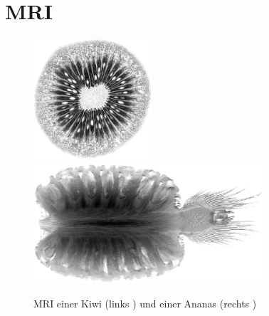 \chapter{MRI\label{chapter:mri}}
\begin{refsection}
%
%
\begin{figure}[H]
	\centering
	\includegraphics[height = 4.5cm]{./mri/pic/Kiwi.jpg}
	\qquad
	\includegraphics[height = 4.5cm]{./mri/pic/Pinaple.jpg}
	\caption{MRI einer Kiwi (links \cite{skript:mri:kiwi}) und einer
		Ananas (rechts \cite{skript:mri:pinaple})}
	\label{mri:abb}
\end{figure}
%
%
%




\printbibliography[heading=subbibliography]
\end{refsection}
